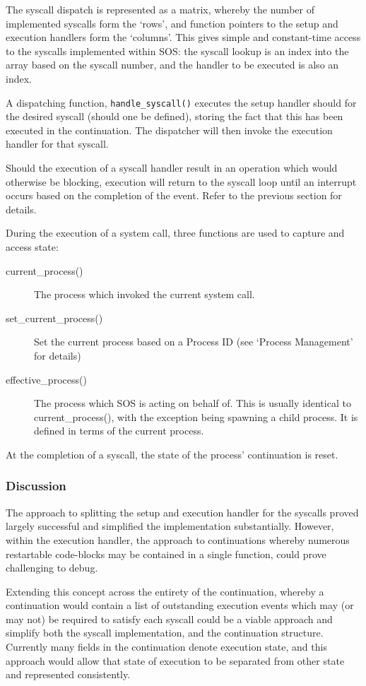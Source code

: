 \documentclass[a4paper,12pt]{article}
\begin{document}
The syscall dispatch is represented as a matrix, whereby the number of
implemented syscalls form the `rows', and function pointers to the setup and
execution handlers form the `columns'.  This gives simple and constant-time
access to the syscalls implemented within SOS: the syscall lookup is an index
into the array based on the syscall number, and the handler to be executed is
also an index.

A dispatching function, \texttt{handle\_syscall()} executes the setup handler
should for the desired syscall (should one be defined), storing the fact that
this has been executed in the continuation.  The dispatcher will then invoke
the execution handler for that syscall.

Should the execution of a syscall handler result in an operation which would
otherwise be blocking, execution will return to the syscall loop until an
interrupt occurs based on the completion of the event.  Refer to the previous
section for details.

During the execution of a system call, three functions are used to capture and
access state:
\begin{description}
\item[current\_process()] The process which invoked the current system call.
\item[set\_current\_process()] Set the current process based on a Process ID (see
  `Process Management' for details)
\item[effective\_process()] The process which SOS is acting on behalf of.  This
  is usually identical to current\_process(), with the exception being spawning
  a child process.  It is defined in terms of the current process.
\end{description}
At the completion of a syscall, the state of the process' continuation is
reset.

\subsubsection{Discussion}
The approach to splitting the setup and execution handler for the syscalls
proved largely successful and simplified the implementation substantially.  However,
within the execution handler, the approach to continuations whereby numerous
restartable code-blocks may be contained in a single function, could prove
challenging to debug.

Extending this concept across the entirety of the continuation, whereby a
continuation would contain a list of outstanding execution events which may
(or may not) be required to satisfy each syscall could be a viable approach
and simplify both the syscall implementation, and the continuation structure.
Currently many fields in the continuation denote execution state, and this
approach would allow that state of execution to be separated from other state
and represented consistently.
\end{document}
